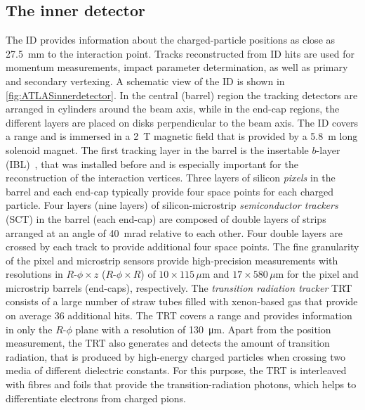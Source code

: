 \subsection{The inner detector}
\label{subsec:inner-detector}
The ID provides information about the charged-particle positions as close as \SI{27.5}{\milli\meter} to the interaction point.
Tracks reconstructed from ID hits are used for momentum measurements, impact parameter determination, as well as primary and secondary vertexing.
A schematic view of the ID is shown in \cref{fig:ATLASinnerdetector}.
In the central (barrel) region the tracking detectors are arranged in cylinders around the beam axis, while in the end-cap regions, the different layers are placed on disks perpendicular to the beam axis.
The ID covers a range  and is immersed in a \SI{2}{\tesla} magnetic field that is provided by a \SI{5.8}{\m} long solenoid magnet.
The first tracking layer in the barrel is the insertable $b$-layer (IBL)~\cite{ATLAS-TDR-19,PIX-2018-001}, that was installed before \RunTwo and is especially important for the reconstruction of the interaction vertices.
Three layers of silicon \emph{pixels} in the barrel and each end-cap typically provide four space points for each charged particle.
Four layers (nine layers) of silicon-microstrip \emph{semiconductor trackers} (SCT) in the barrel (each end-cap) are composed of double layers of strips arranged at an angle of \SI{40}{\milli\radian} relative to each other. Four double layers are crossed by each track to provide additional four space points.
The fine granularity of the pixel and microstrip sensors provide high-precision measurements with resolutions in $R$-$\phi \times z$ ($R$-$\phi \times R$) of $10 \times 115\,\mu\text{m}$ and $17 \times 580\,\mu\text{m}$ for the pixel and microstrip barrels (end-caps), respectively.
The \emph{transition radiation tracker} TRT consists of a large number of straw tubes filled with xenon-based gas that provide on average 36 additional hits. The TRT covers a range  and provides information in only the $R$-$\phi$ plane with a resolution of \SI{130}{\micro\meter}.
Apart from the position measurement, the TRT also generates and detects the amount of transition radiation, that is produced by high-energy charged particles when crossing two media of different dielectric constants. For this purpose, the TRT is interleaved with fibres and foils that provide the transition-radiation photons, which helps to differentiate electrons from charged pions.

